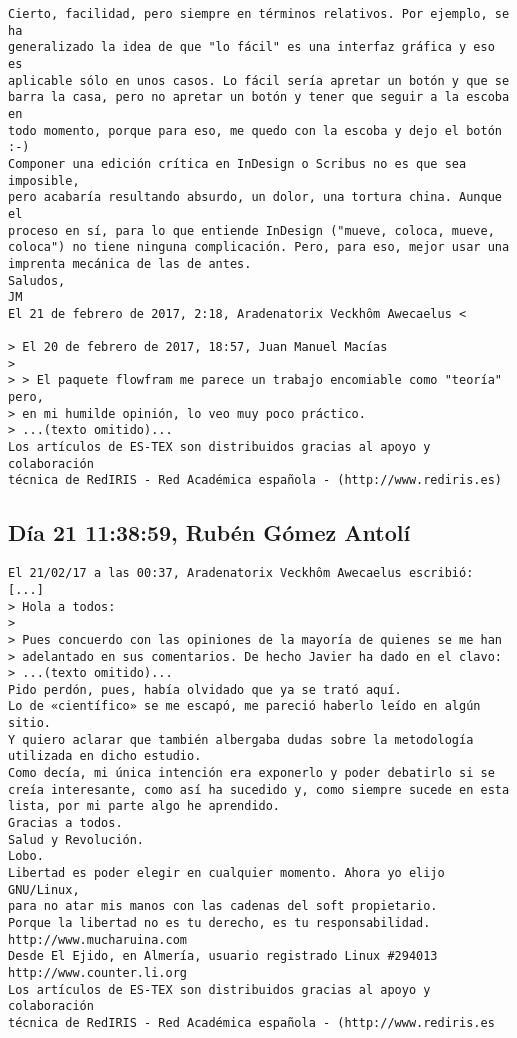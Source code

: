 \documentclass[a4paper,10pt]{article}
\begin{document}
\begin{lstlisting}
Cierto, facilidad, pero siempre en términos relativos. Por ejemplo, se ha
generalizado la idea de que "lo fácil" es una interfaz gráfica y eso es
aplicable sólo en unos casos. Lo fácil sería apretar un botón y que se
barra la casa, pero no apretar un botón y tener que seguir a la escoba en
todo momento, porque para eso, me quedo con la escoba y dejo el botón :-)
Componer una edición crítica en InDesign o Scribus no es que sea imposible,
pero acabaría resultando absurdo, un dolor, una tortura china. Aunque el
proceso en sí, para lo que entiende InDesign ("mueve, coloca, mueve,
coloca") no tiene ninguna complicación. Pero, para eso, mejor usar una
imprenta mecánica de las de antes.
Saludos,
JM
El 21 de febrero de 2017, 2:18, Aradenatorix Veckhôm Awecaelus <

> El 20 de febrero de 2017, 18:57, Juan Manuel Macías
> 
> > El paquete flowfram me parece un trabajo encomiable como "teoría" pero,
> en mi humilde opinión, lo veo muy poco práctico.
> ...(texto omitido)...
Los artículos de ES-TEX son distribuidos gracias al apoyo y colaboración 
técnica de RedIRIS - Red Académica española - (http://www.rediris.es)

\end{lstlisting}

\subsection{Día 21 11:38:59, Rubén Gómez Antolí}

\begin{lstlisting}
El 21/02/17 a las 00:37, Aradenatorix Veckhôm Awecaelus escribió:
[...]
> Hola a todos:
> 
> Pues concuerdo con las opiniones de la mayoría de quienes se me han
> adelantado en sus comentarios. De hecho Javier ha dado en el clavo:
> ...(texto omitido)...
Pido perdón, pues, había olvidado que ya se trató aquí.
Lo de «científico» se me escapó, me pareció haberlo leído en algún sitio.
Y quiero aclarar que también albergaba dudas sobre la metodología
utilizada en dicho estudio.
Como decía, mi única intención era exponerlo y poder debatirlo si se
creía interesante, como así ha sucedido y, como siempre sucede en esta
lista, por mi parte algo he aprendido.
Gracias a todos.
Salud y Revolución.
Lobo.
Libertad es poder elegir en cualquier momento. Ahora yo elijo GNU/Linux,
para no atar mis manos con las cadenas del soft propietario.
Porque la libertad no es tu derecho, es tu responsabilidad.
http://www.mucharuina.com
Desde El Ejido, en Almería, usuario registrado Linux #294013
http://www.counter.li.org
Los artículos de ES-TEX son distribuidos gracias al apoyo y colaboración 
técnica de RedIRIS - Red Académica española - (http://www.rediris.es

\end{lstlisting}
\end{document}
